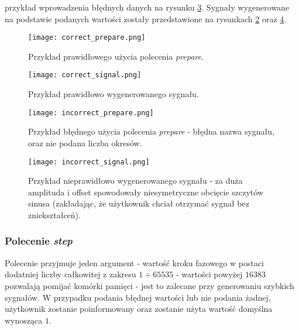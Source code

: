             przykład wprowadzenia błędnych danych na rysunku \ref{fig:prepare_incorrect}. Sygnały wygenerowane na 
            podstawie podanych wartości zostały przedstawione na rysunkach \ref{fig:signal_correct} oraz \ref{fig:signal_incorrect}.
            \begin{figure}[!ht]
                \centering
                \texttt{[image: correct\_prepare.png]}
                \caption{Przykład prawidłowego użycia polecenia \textit{prepare}.}
                \label{fig:prepare_correct}
            \end{figure}
            \begin{figure}[!ht]
                \centering
                \texttt{[image: correct\_signal.png]}
                \caption{Przykład prawidłowo wygenerowanego sygnału.}
                \label{fig:signal_correct}
            \end{figure}

            \begin{figure}[!ht]
                \centering
                \texttt{[image: incorrect\_prepare.png]}
                \caption{Przykład błędnego użycia polecenia \textit{prepare} - błędna nazwa sygnału, oraz nie podana liczba okresów.}
                \label{fig:prepare_incorrect}
            \end{figure}
            \begin{figure}[!ht]
                \centering
                \texttt{[image: incorrect\_signal.png]}
                \caption{Przykład nieprawidłowo wygenerowanego sygnału - za duża amplituda i offset spowodowały niesymetryczne obcięcie szczytów sinusa (zakładając, że użytkownik chciał otrzymać sygnał bez zniekształceń).}
                \label{fig:signal_incorrect}
            \end{figure}
            
        \subsubsection{Polecenie \textit{step}}
            Polecenie przyjmuje jeden argument - wartość kroku fazowego w postaci dodatniej liczby całkowitej 
            z zakresu $1 \div 65535$ - wartości powyżej $16383$ pozwalają pomijać komórki pamięci - jest to zalecane 
            przy generowaniu szybkich sygnałów. W przypadku podania błędnej wartości lub nie podania żadnej, użytkownik zostanie 
            poinformowany oraz zostanie użyta wartość domyślna wynosząca $1$.
